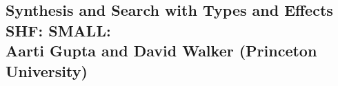 \documentclass[11pt]{article}
\newcommand{\mytitle}{Synthesis and Search with Types and Effects}
\begin{document}

%

\newpage
{}
\setcounter{page}{1}

\begin{centering}
\section*{{\LARGE  \mytitle}  \\ 
   {\normalsize SHF: SMALL: } \\
   {\normalsize Aarti Gupta and David Walker (Princeton University)} }
\end{centering}

\makeatletter
\renewcommand{\paragraph}{%
  \@startsection{paragraph}{4}%
  {\z@}{0.5ex \@plus 0.5ex \@minus .2ex}{-1em}%
  {\normalfont\normalsize\bfseries}%
}
\makeatother



%

\newpage

\setcounter{page}{1}



\newpage
\end{document}
